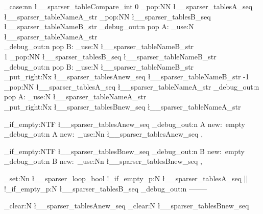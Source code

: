 {{		%
		\int_case:nn {\l__sparser_tableCompare_int}
		{
			{0} {
				\seq_pop:NN \l__sparser_tablesA_seq \l__sparser_tableNameA_str
				\seq_pop:NN \l__sparser_tablesB_seq \l__sparser_tableNameB_str
				\sparser_debug_out:n {pop A: \str_use:N \l__sparser_tableNameA_str\\}
				\sparser_debug_out:n {pop B: \str_use:N \l__sparser_tableNameB_str\\}
			}
			{1} {
				\seq_pop:NN \l__sparser_tablesB_seq \l__sparser_tableNameB_str
				\sparser_debug_out:n {pop B: \str_use:N \l__sparser_tableNameB_str\\}
				\seq_put_right:Nx \l__sparser_tablesAnew_seq \l__sparser_tableNameB_str
			}
			{-1} {
				\seq_pop:NN \l__sparser_tablesA_seq \l__sparser_tableNameA_str
				\sparser_debug_out:n {pop A: \str_use:N \l__sparser_tableNameA_str\\}
				\seq_put_right:Nx \l__sparser_tablesBnew_seq \l__sparser_tableNameA_str
			}
		}

		\seq_if_empty:NTF \l__sparser_tablesAnew_seq
		{
			\sparser_debug_out:n {A new:\ \textcolor{spred}{empty}\\}
		}{
			\sparser_debug_out:n {A new:\ \seq_use:Nn \l__sparser_tablesAnew_seq {,}\\}
		}
		
		\seq_if_empty:NTF \l__sparser_tablesBnew_seq
		{
			\sparser_debug_out:n {B new:\ \textcolor{spred}{empty}\\}
		}{
			\sparser_debug_out:n {B new:\ \seq_use:Nn \l__sparser_tablesBnew_seq {,}\\}
		}
				
		\bool_set:Nn \l__sparser_loop_bool {
			!\seq_if_empty_p:N \l__sparser_tablesA_seq || !\seq_if_empty_p:N \l__sparser_tablesB_seq
		}
		\sparser_debug_out:n {--------\\}
	}
	
	\seq_clear:N \l__sparser_tablesAnew_seq
	\seq_clear:N \l__sparser_tablesBnew_seq
	\dtlnoexpandnewvalue
}

